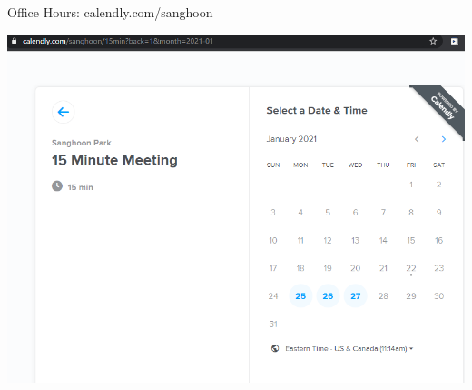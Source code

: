 \documentclass[xcolor=dvipsnames]{beamer}
\begin{document}
	\begin{frame}[fragile]{Office Hours: calendly.com/sanghoon}
		\begin{center}	\includegraphics[width=0.7\linewidth]{officehours2.png}	\end{center}
	\end{frame}
	
\end{document}
